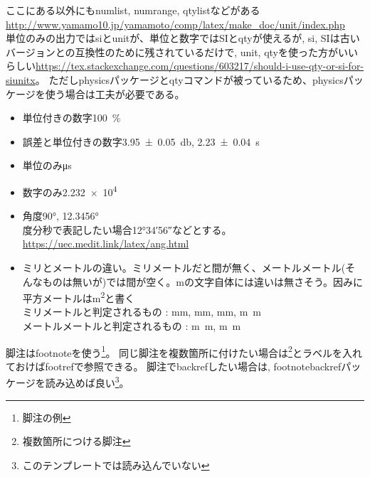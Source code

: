 \documentclass[uplatex, a4paper, dvipdfmx, 12pt]{jsreport}
\begin{document}
		ここにある以外にも\tbs numlist, \tbs numrange, \tbs qtylistなどがある\url{http://www.yamamo10.jp/yamamoto/comp/latex/make_doc/unit/index.php}\\
		単位のみの出力では\tbs siと\tbs unitが、単位と数字では\tbs SIと\tbs qtyが使えるが, \tbs si, \tbs SIは古いバージョンとの互換性のために残されているだけで, \tbs unit, \tbs qtyを使った方がいいらしい\url{https://tex.stackexchange.com/questions/603217/should-i-use-qty-or-si-for-siunitx}。
		ただしphysicsパッケージと\tbs qtyコマンドが被っているため、physicsパッケージを使う場合は工夫が必要である。
		\begin{itemize}
			\item 単位付きの数字\qty{100}{\percent}
			\item 誤差と単位付きの数字\qty{3.95+-0.05}{\decibel}, \qty{2.23\pm 0.04}{s}
			\item 単位のみ\unit{\micro s}
			\item 数字のみ\num{2.232e4}
			\item 角度\ang{90}, \ang{12.3456}\\
					度分秒で表記したい場合\ang{12;34;56}などとする。\url{https://uec.medit.link/latex/ang.html}
			\item ミリとメートルの違い。ミリメートルだと間が無く、メートルメートル(そんなものは無いが)では間が空く。mの文字自体には違いは無さそう。因みに平方メートルは\si{m^2}と書く\\
					ミリメートルと判定されるもの : \unit{mm}, \unit{\milli\meter}, \unit{\milli m}, \unit{m\meter}\\
					メートルメートルと判定されるもの : \unit{\meter\meter}, \unit{m.m}
		\end{itemize}

		脚注は\tbs footnoteを使う\footnote{脚注の例}。
		同じ脚注を複数箇所に付けたい場合は\footnote{複数箇所につける脚注\label{fot:複数箇所につける脚注}}とラベルを入れておけば\tbs footrefで参照できる。
		脚注でbackrefしたい場合は, footnotebackrefパッケージを読み込めば良い\footnote{このテンプレートでは読み込んでいない}。

\end{document}
